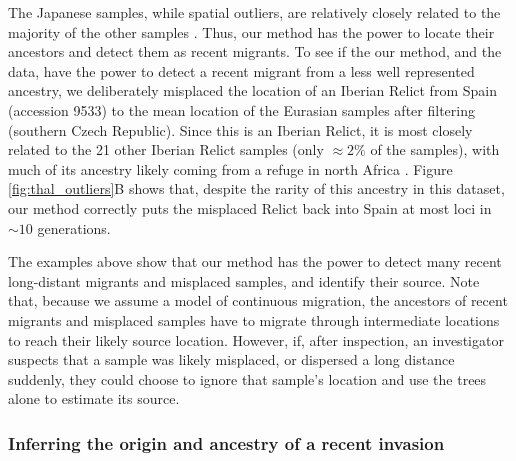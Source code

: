 \documentclass[12pt]{article}
\begin{document}
The Japanese samples, while spatial outliers, are relatively closely related to the majority of the other samples \citep{alonso2016}. 
Thus, our method has the power to locate their ancestors and detect them as recent migrants.
To see if the our method, and the data, have the power to detect a recent migrant from a less well represented ancestry, we deliberately misplaced the location of an Iberian Relict from Spain (accession 9533) to the mean location of the Eurasian samples after filtering (southern Czech Republic).
Since this is an Iberian Relict, it is most closely related to the 21 other Iberian Relict samples (only $\approx2\%$ of the samples), with much of its ancestry likely coming from a refuge in north Africa \citep{alonso2016,durvasula2017african,fulgione2018madeiran}.
Figure \ref{fig:thal_outliers}B shows that, despite the rarity of this ancestry in this dataset, our method correctly puts the misplaced Relict back into Spain at most loci in $\sim10$ generations.

The examples above show that our method has the power to detect many recent long-distant migrants and misplaced samples, and identify their source.
Note that, because we assume a model of continuous migration, the ancestors of recent migrants and misplaced samples have to migrate through intermediate locations to reach their likely source location. 
However, if, after inspection, an investigator suspects that a sample was likely misplaced, or dispersed a long distance suddenly, they could choose to ignore that sample's location and use the trees alone to estimate its source. 

\subsubsection*{Inferring the origin and ancestry of a recent invasion}
\end{document}
